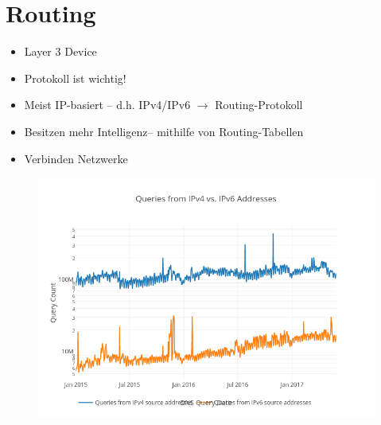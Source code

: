 \documentclass[xcolor=dvipsnames]{beamer}
\begin{document}
\section{Routing}
\begin{frame}
	\begin{itemize}
		\item Layer 3 Device
		\item Protokoll ist wichtig!
		\item Meist IP-basiert -- d.h. IPv4/IPv6 $\rightarrow$ Routing-Protokoll
		\item \glqq Besitzen mehr Intelligenz\grqq -- mithilfe von Routing-Tabellen
		\item Verbinden Netzwerke
	\end{itemize}
\end{frame}

\begin{frame}
\vspace{-0.25cm}
\begin{figure}
\centering
\includegraphics[scale=0.4]{ip}
\end{figure}
\end{frame}
\end{document}
